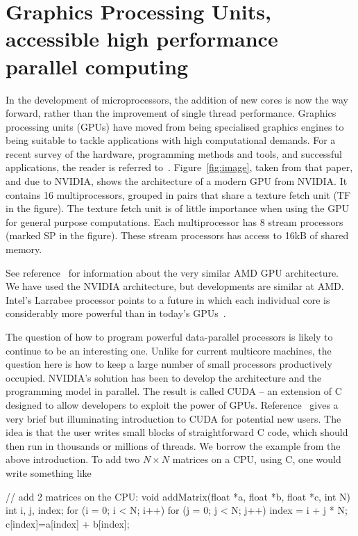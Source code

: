 \section{Graphics Processing Units, accessible high performance parallel computing}
\label{sec:gpu}

In the development of microprocessors, the addition of new cores is now the
way forward, rather than the improvement of single thread performance.
Graphics processing units (GPUs) have moved from being specialised graphics
engines to being suitable to tackle applications with high computational
demands. For a recent survey of the hardware, programming methods and tools,
and successful applications, the reader is referred to~\cite{GPUComputing}.
Figure~\ref{fig:image}, taken from that paper, and due to NVIDIA, shows the
architecture of a modern GPU from NVIDIA. It contains 16 multiprocessors, 
grouped in pairs that share a texture fetch unit (TF in the figure). The 
texture fetch unit is of little importance when using the GPU for general 
purpose computations. Each multiprocessor has 8 stream processors (marked 
SP in the figure). These stream processors has access to 16kB of shared memory.  

See reference~\cite{GPUComputing} for information about
the very similar AMD GPU architecture. We have used the NVIDIA architecture,
but developments are similar at AMD. Intel's Larrabee processor points to a
future in which each individual core is considerably more powerful than in
today's GPUs~\cite{IntelLarrabee}.


The question of how to program powerful data-parallel processors is likely
to continue to be an interesting one. Unlike for current multicore machines,
the question here is how to keep a large number of small processors
productively occupied. NVIDIA's solution has been to develop the
architecture and the programming model in parallel. The result is called
CUDA -- an extension of C designed to allow developers to exploit the power
of GPUs. Reference~\cite{GPUCudaLuebke} gives a very brief but illuminating
introduction to CUDA for potential new users. The idea is that the user
writes small blocks of straightforward C code, which should then run in
thousands or millions of threads. We borrow the example from the above
introduction. To add two $N \times N$ matrices on a CPU, using C, one would
write something like

\begin{code}
// add 2 matrices on the CPU:
void addMatrix(float *a, float *b, float *c, int N)
{
  int i, j, index;
  for (i = 0; i < N; i++) {
    for (j = 0; j < N; j++) {
      index = i + j * N;
      c[index]=a[index] + b[index];
    }
  }
}
\end{code}
\FloatBarrier

